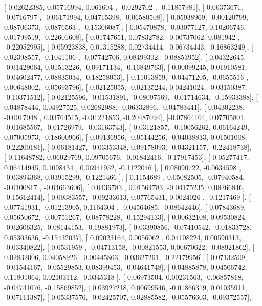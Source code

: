 \documentclass{article}
\begin{document}
       [-0.02622385,  0.05716994,  0.061604  , -0.0292702 , -0.11857981],
       [ 0.06373671, -0.0716797 , -0.06171994,  0.04715398, -0.06580508],
       [ 0.05938969, -0.00120799,  0.08706373, -0.0876563 , -0.15306087],
       [ 0.05470878, -0.03077127,  0.10206746,  0.01799519, -0.22601608],
       [ 0.01747651,  0.07832782, -0.00737062,  0.081942  , -0.22052995],
       [ 0.05923838,  0.01315288,  0.02734414, -0.06734443, -0.16863249],
       [ 0.02398557, -0.1041106 , -0.07742706,  0.08499302, -0.08853952],
       [ 0.04322645, -0.01429064,  0.01513226, -0.09171134, -0.16849763],
       [-0.00099245,  0.01910581, -0.04602477,  0.08835034, -0.18258053],
       [-0.11013859, -0.04471205, -0.0655516 ,  0.00648002, -0.05693796],
       [-0.02125055, -0.02135244,  0.04241024, -0.03150387, -0.10371512],
       [-0.02125596, -0.01531891, -0.08097569, -0.01714634, -0.15933388],
       [ 0.04878444,  0.04927525,  0.02682088, -0.06332896, -0.04783441],
       [-0.04302238, -0.0017048 ,  0.03764515, -0.01221853, -0.20487094],
       [-0.07864164,  0.07705801, -0.01685567, -0.01726979, -0.03163743],
       [ 0.03121857, -0.10056262,  0.06164249,  0.07005973, -0.18600966],
       [-0.09136956, -0.05144256, -0.04038833,  0.01501008, -0.22200181],
       [ 0.06181427, -0.03353348,  0.09178093, -0.04321157, -0.22418738],
       [-0.11648782,  0.06029769,  0.09705676, -0.01842416, -0.17917453],
       [ 0.05277417,  0.06414945,  0.1098434 ,  0.06941952, -0.1122046 ],
       [ 0.08090722, -0.0634598 , -0.03894368,  0.03915299, -0.1221466 ],
       [-0.1154689 ,  0.05082505, -0.07940584, -0.0100817 , -0.04663606],
       [ 0.0436783 ,  0.01564783, -0.04175235,  0.08266846, -0.15612414],
       [-0.09383557, -0.09233613,  0.07765431,  0.0024026 , -0.1217469 ],
       [ 0.07741931, -0.01213905,  0.1164304 , -0.04564685, -0.08642446],
       [ 0.07843689,  0.05650672, -0.00751267, -0.08778228, -0.15294133],
       [-0.00632108,  0.09530824, -0.02606325, -0.08144153, -0.19881973],
       [-0.03390856, -0.07410542, -0.01833728,  0.05303636, -0.15432037],
       [ 0.09023164,  0.0056062 ,  0.04108224,  0.00590313, -0.03340822],
       [-0.0531959 , -0.04713158, -0.00821553,  0.00670622, -0.08921862],
       [ 0.02832006,  0.04058926, -0.00445863, -0.03627261, -0.22179956],
       [ 0.07132509, -0.01544167, -0.05529853,  0.08399453, -0.04641748],
       [-0.04885878,  0.04506742,  0.11801064,  0.02103112, -0.0345318 ],
       [ 0.06973504,  0.00231563, -0.06857818, -0.04741076, -0.15869852],
       [ 0.03927218,  0.00699546, -0.01866319,  0.01035911, -0.07111387],
       [-0.05337576, -0.02425707,  0.02885582, -0.05576603, -0.09372557],
\end{document}
